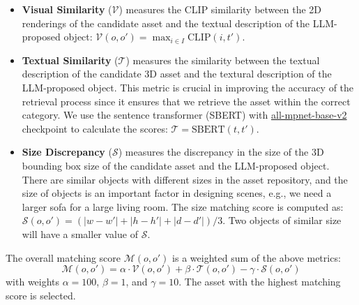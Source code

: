 \begin{itemize}
    \item \textbf{Visual Similarity} ($\mathcal{V}$) measures the CLIP similarity between the 2D renderings of the candidate asset and the textual description of the LLM-proposed object: $\mathcal{V}(o, o') = \max_{i \in I}\text{CLIP}(i, t')$.
    \item \textbf{Textual Similarity} ($\mathcal{T}$) measures the similarity between the textual description of the candidate 3D asset and the textural description of the LLM-proposed object. This metric is crucial in improving the accuracy of the retrieval process since it ensures that we retrieve the asset within the correct category. We use the sentence transformer (SBERT) \cite{reimers-2019-sentence-bert} with \href{https://huggingface.co/sentence-transformers/all-mpnet-base-v2}{all-mpnet-base-v2} checkpoint to calculate the scores: $\mathcal{T} = \text{SBERT}(t, t')$.
    \item \textbf{Size Discrepancy} ($\mathcal{S}$) measures the discrepancy in the size of the 3D bounding box size of the candidate asset and the LLM-proposed object. There are similar objects with different sizes in the asset repository, and the size of objects is an important factor in designing scenes, e.g., we need a larger sofa for a large living room. The size matching score is computed as: $\mathcal{S}(o, o') = \left(|w-w'| + |h - h'| + |d - d'|\right)/3$. Two objects of similar size will have a smaller value of $\mathcal{S}$.
\end{itemize}

The overall matching score $\mathcal{M} \left(o, o'\right)$ is a weighted sum of the above metrics:
\begin{equation}
    \mathcal{M} \left(o, o'\right) = \alpha \cdot \mathcal{V}\left(o, o'\right) + \beta \cdot \mathcal{T} (o, o') - \gamma \cdot \mathcal{S} (o, o')
\end{equation}
with weights $\alpha = 100$, $\beta = 1$, and $\gamma = 10$. The asset with the highest matching score is selected.

